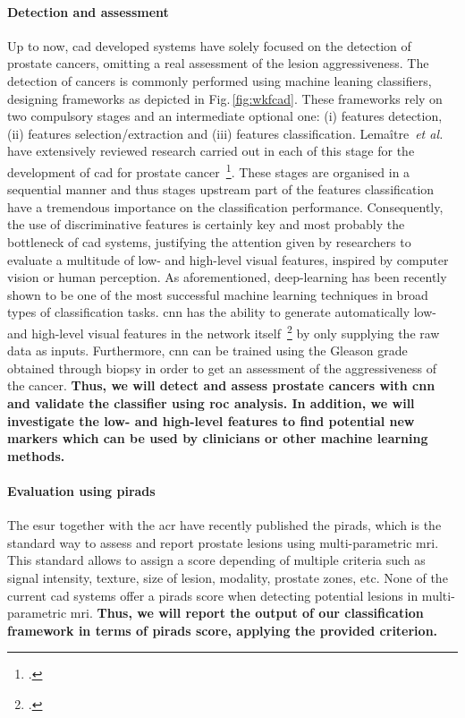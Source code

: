 \paragraph{Detection and assessment}

Up to now, \ac{cad} developed systems have solely focused on the detection of prostate cancers, omitting a real assessment of the lesion aggressiveness.
The detection of cancers is commonly performed using machine leaning classifiers, designing frameworks as depicted in Fig.\,\ref{fig:wkfcad}.
These frameworks rely on two compulsory stages and an intermediate optional one: (i) features detection, (ii) features selection/extraction and (iii) features classification.
Lema\^itre~\emph{et al.} have extensively reviewed research carried out in each of this stage for the development of \ac{cad} for prostate cancer~\footcite{Lemaitre2015}.
These stages are organised in a sequential manner and thus stages upstream part of the features classification have a tremendous importance on the classification performance.
Consequently, the use of discriminative features is certainly key and most probably the bottleneck of \ac{cad} systems, justifying the attention given by researchers to evaluate a multitude of low- and high-level visual features, inspired by computer vision or human perception.
As aforementioned, deep-learning has been recently shown to be one of the most successful machine learning techniques in broad types of classification tasks.
\ac{cnn} has the ability to generate automatically low- and high-level visual features in the network itself~\footcite{Zeiler2013} by only supplying the raw data as inputs.
Furthermore, \ac{cnn} can be trained using the Gleason grade obtained through biopsy in order to get an assessment of the aggressiveness of the cancer.
\textbf{Thus, we will detect and assess prostate cancers with \ac{cnn} and validate the classifier using \ac{roc} analysis. In addition, we will investigate the low- and high-level features to find potential new markers which can be used by clinicians or other machine learning methods.}

\paragraph{Evaluation using \acs*{pirads}}

The \ac{esur} together with the \ac{acr} have recently published the \ac{pirads}, which is the standard way to assess and report prostate lesions using multi-parametric \ac{mri}.
This standard allows to assign a score depending of multiple criteria such as signal intensity, texture, size of lesion, modality, prostate zones, etc.
None of the current \ac{cad} systems offer a \ac{pirads} score when detecting potential lesions in multi-parametric \ac{mri}.
\textbf{Thus, we will report the output of our classification framework in terms of \ac{pirads} score, applying the provided criterion.}

